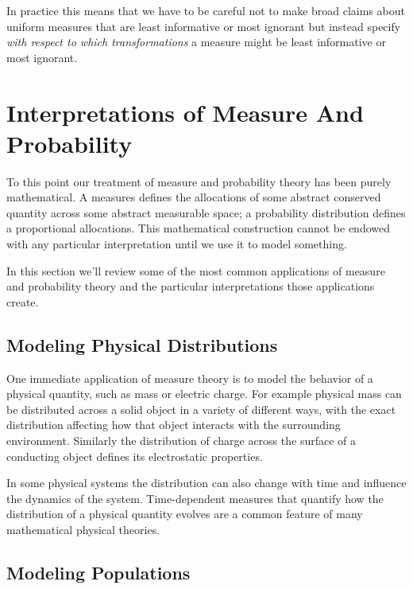 \documentclass[
  letterpaper,
  DIV=11,
  numbers=noendperiod]{scrartcl}
\begin{document}
In practice this means that we have to be careful not to make broad
claims about uniform measures that are least informative or most
ignorant but instead specify \emph{with respect to which
transformations} a measure might be least informative or most ignorant.

\hypertarget{sec:interpretations}{%
\section{Interpretations of Measure And
Probability}\label{sec:interpretations}}

To this point our treatment of measure and probability theory has been
purely mathematical. A measures defines the allocations of some abstract
conserved quantity across some abstract measurable space; a probability
distribution defines a proportional allocations. This mathematical
construction cannot be endowed with any particular interpretation until
we use it to model something.

In this section we'll review some of the most common applications of
measure and probability theory and the particular interpretations those
applications create.

\hypertarget{modeling-physical-distributions}{%
\subsection{Modeling Physical
Distributions}\label{modeling-physical-distributions}}

One immediate application of measure theory is to model the behavior of
a physical quantity, such as mass or electric charge. For example
physical mass can be distributed across a solid object in a variety of
different ways, with the exact distribution affecting how that object
interacts with the surrounding environment. Similarly the distribution
of charge across the surface of a conducting object defines its
electrostatic properties.

In some physical systems the distribution can also change with time and
influence the dynamics of the system. Time-dependent measures that
quantify how the distribution of a physical quantity evolves are a
common feature of many mathematical physical theories.

\hypertarget{modeling-populations}{%
\subsection{Modeling Populations}\label{modeling-populations}}
\end{document}
